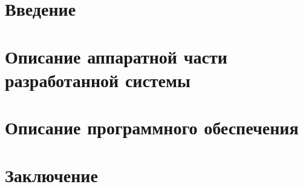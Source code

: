 \documentclass[14pt]{extarticle}
\begin{document}
\begin{titlepage}

\end{titlepage}

\tableofcontents
\newpage 

\section{Введение}

\newpage  

\section{Описание аппаратной части разработанной системы}

\newpage

\section{Описание программного обеспечения}

\newpage

\section{Заключение}

\newpage


\end{document}
